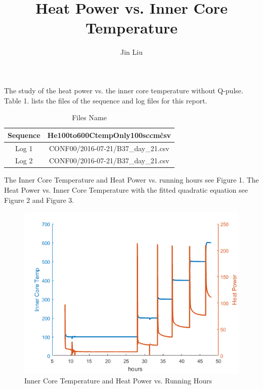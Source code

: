 \documentclass{article}
\title{Heat Power vs. Inner Core Temperature}
\author{Jin Liu}
\begin{document}
\maketitle


The study of the heat power vs. the inner core temperature without Q-pulse.\\
Table 1. lists the files of the sequence and log files for this report.

\begin{table}
[h]
\centering
\caption{Files Name}
\begin{tabular}{|c|c|}
\hline
Sequence & He100to600CtempOnly100sccm\.csv\\ \hline
Log 1 & CONF00/2016-07-21/B37\_day\_21.csv\\  \hline
Log 2 & CONF00/2016-07-21/B37\_day\_21.csv\\ \hline
\end{tabular}
\end{table}


The Inner Core Temperature and Heat Power vs. running hours see Figure 1. 
The Heat Power vs. Inner Core Temperature with the fitted quadratic equation see Figure 2 and Figure 3. 


\begin{figure}
[h]
\begin{center}
\includegraphics[scale=0.7]{hourvsTempPower.png} 
\caption{Inner Core Temperature and Heat Power vs. Running Hours}%
\end{center}
\end{figure}
\end{document}

